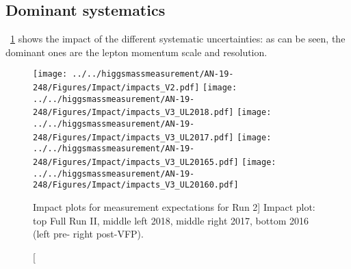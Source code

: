 \subsection{Dominant systematics}
\figurename~\ref{mass_impact} shows the impact of the different systematic uncertainties: as can be seen,
the dominant ones are the lepton momentum scale and resolution.
\begin{figure}[!htbp]
\begin{center}
	\texttt{[image: ../../higgsmassmeasurement/AN-19-248/Figures/Impact/impacts\_V2.pdf]}
	\texttt{[image: ../../higgsmassmeasurement/AN-19-248/Figures/Impact/impacts\_V3\_UL2018.pdf]}
	\texttt{[image: ../../higgsmassmeasurement/AN-19-248/Figures/Impact/impacts\_V3\_UL2017.pdf]}
	\texttt{[image: ../../higgsmassmeasurement/AN-19-248/Figures/Impact/impacts\_V3\_UL20165.pdf]}
	\texttt{[image: ../../higgsmassmeasurement/AN-19-248/Figures/Impact/impacts\_V3\_UL20160.pdf]}
	\caption
        [Impact plots for \mH measurement expectations for Run 2]
        {Impact plot: top Full Run II, middle left 2018, middle right 2017, bottom
        2016 (left pre- right post-VFP).}
	\label{mass_impact}
\end{center}
\end{figure}

